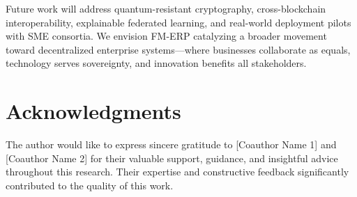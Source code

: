 \documentclass[times,10pt,twocolumn]{jucs2e}
\begin{document}
Future work will address quantum-resistant cryptography, cross-blockchain interoperability, explainable federated learning, and real-world deployment pilots with SME consortia. We envision FM-ERP catalyzing a broader movement toward decentralized enterprise systems—where businesses collaborate as equals, technology serves sovereignty, and innovation benefits all stakeholders.


\section*{Acknowledgments}

The author would like to express sincere gratitude to [Coauthor Name 1] and [Coauthor Name 2] for their valuable support, guidance, and insightful advice throughout this research. Their expertise and constructive feedback significantly contributed to the quality of this work.









\end{document}
